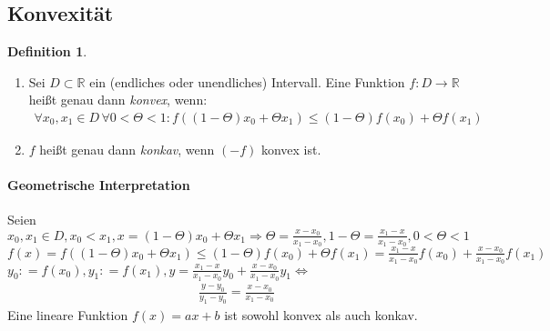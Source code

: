 \documentclass[ngerman,titlepage,twoside, parskip=half*]{scrreprt}
\newcommand*{\R}{\mathbb{R}}
\theoremstyle{plain}
\theoremstyle{definition}
\newtheorem{definition}{Definition}
\theoremstyle{remark}
\newcommand*{\coloneqq}{\mathrel{\mathop:}=}
\begin{document}
\subsection{Konvexität}
\begin{definition}
  \begin{enumerate}[(1)]
    \item Sei $D\subset\R$ ein (endliches oder unendliches) Intervall.
      Eine Funktion $f\colon D\rightarrow\R$ heißt genau dann \emph{konvex}, wenn:
      \begin{gather*}\forall x_0,x_1\in D\,\forall 0<\Theta<1\colon f( (1-\Theta)x_0+\Theta x_1)\leq(1-\Theta)f(x_0)+\Theta f(x_1)\end{gather*}
    \item $f$ heißt genau dann
      \emph{konkav}, wenn $(-f)$
      konvex ist.
  \end{enumerate}
\end{definition}
  
\paragraph{Geometrische Interpretation}
Seien $x_0,x_1\in D, x_0<x_1, x=(1-\Theta)x_0+\Theta x_1\Rightarrow
\Theta=\frac{x-x_0}{x_1-x_0}, 1-\Theta=\frac{x_1-x}{x_1-x_0}, 0<\Theta<1$\\
$f(x)=f( (1-\Theta)x_0+\Theta x_1)\leq (1-\Theta)f(x_0)+\Theta f(x_1)
=\frac{x_1-x}{x_1-x_0}f(x_0)+\frac{x-x_0}{x_1-x_0}f(x_1)$\\
$y_0\coloneqq f(x_0), y_1\coloneqq f(x_1), y=\frac{x_1-x}{x_1-x_0}y_0+\frac{x-x_0}{x_1-x_0}y_1
\Leftrightarrow$
\begin{gather*}\frac{y-y_0}{y_1-y_0}=\frac{x-x_0}{x_1-x_0}\end{gather*}
Eine lineare Funktion $f(x)=ax+b$ ist sowohl konvex als auch konkav.
\end{document}
